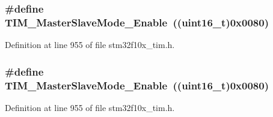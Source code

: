 \subsubsection[{\texorpdfstring{T\+I\+M\+\_\+\+Master\+Slave\+Mode\+\_\+\+Enable}{TIM_MasterSlaveMode_Enable}}]{\setlength{\rightskip}{0pt plus 5cm}\#define T\+I\+M\+\_\+\+Master\+Slave\+Mode\+\_\+\+Enable~(({\bf uint16\+\_\+t})0x0080)}\hypertarget{group___t_i_m___master___slave___mode_gaef5da910ae6952fce424b440ea39f69a}{}\label{group___t_i_m___master___slave___mode_gaef5da910ae6952fce424b440ea39f69a}


Definition at line 955 of file stm32f10x\+\_\+tim.\+h.

\subsubsection[{\texorpdfstring{T\+I\+M\+\_\+\+Master\+Slave\+Mode\+\_\+\+Enable}{TIM_MasterSlaveMode_Enable}}]{\setlength{\rightskip}{0pt plus 5cm}\#define T\+I\+M\+\_\+\+Master\+Slave\+Mode\+\_\+\+Enable~(({\bf uint16\+\_\+t})0x0080)}\hypertarget{group___t_i_m___master___slave___mode_gaef5da910ae6952fce424b440ea39f69a}{}\label{group___t_i_m___master___slave___mode_gaef5da910ae6952fce424b440ea39f69a}


Definition at line 955 of file stm32f10x\+\_\+tim.\+h.

